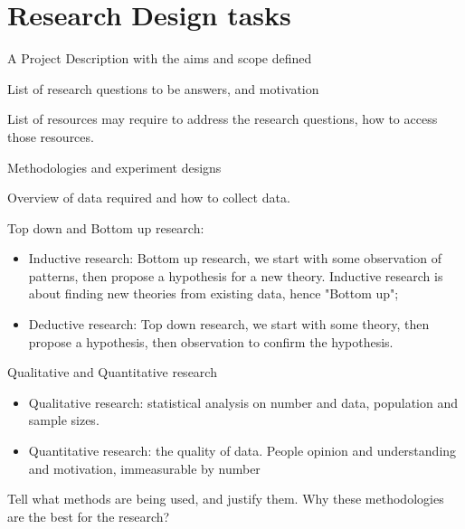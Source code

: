 \section{Research Design tasks}
\begin{todolist}
    \item[\done] A Project Description with the aims and scope defined
    \item[\done] List of research questions to be answers, and motivation
    \item List of resources may require to address the research questions, how to access those resources.
    \item Methodologies and experiment designs
    \item Overview of data required and how to collect data.
\end{todolist}

Top down and Bottom up research:
\begin{itemize}
    \item Inductive research: Bottom up research, we start with some observation of patterns, then propose a hypothesis for a new theory. Inductive research is about finding new theories from existing data, hence "Bottom up";
    \item Deductive research: Top down research, we start with some theory, then propose a hypothesis, then observation to confirm the hypothesis.
\end{itemize}

Qualitative and Quantitative research
\begin{itemize}
    \item Qualitative research: statistical analysis on number and data, population and sample sizes.
    \item Quantitative research: the quality of data. People opinion and understanding and motivation, immeasurable by number
\end{itemize}

Tell what methods are being used, and justify them.
Why these methodologies are the best for the research?

